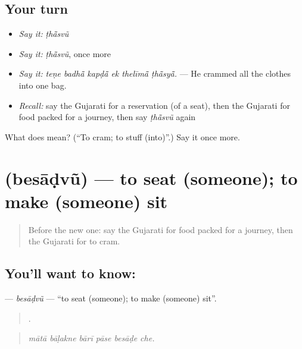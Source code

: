 \subsection*{Your turn}
\begin{itemize}
\raggedright
  \item \emph{Say it:} \emph{ṭhā̃svũ}
  \item \emph{Say it:} \emph{ṭhā̃svũ}, once more
  \item \emph{Say it:} \emph{teṇe badhā̃ kapḍā̃ ek thelīmā̃ ṭhā̃syā̃.} — He crammed all the clothes into one bag.
  \item \emph{Recall:} say the Gujarati for a reservation (of a seat), then the Gujarati for food packed for a journey, then say \emph{ṭhā̃svũ} again
\end{itemize}

\begin{tcolorbox}[breakable,colback=teal!4,colframe=teal!35!black,title={Before you move on}]
What does  mean? (\textquotedblleft{}To cram; to stuff (into)\textquotedblright{}.) Say it once more.
\end{tcolorbox}
\section[\texorpdfstring{\gu{બેસાડવું} (besāḍvũ)}{બેસાડવું (besāḍvũ)}]{ (besāḍvũ) — to seat (someone); to make (someone) sit}

\label{lesson:GU-C395-besadvu}



\begin{quote}
Before the new one: say the Gujarati for food packed for a journey, then the Gujarati for to cram.
\end{quote}

\subsection*{You'll want to know: }
\textbf{} — \emph{besāḍvũ} — \textquotedblleft{}to seat (someone); to make (someone) sit\textquotedblright{}.

\begin{quote}
     .
\end{quote}

\begin{quote}
\emph{mātā bāḷakne bārī pāse besāḍe che.}
\end{quote}

